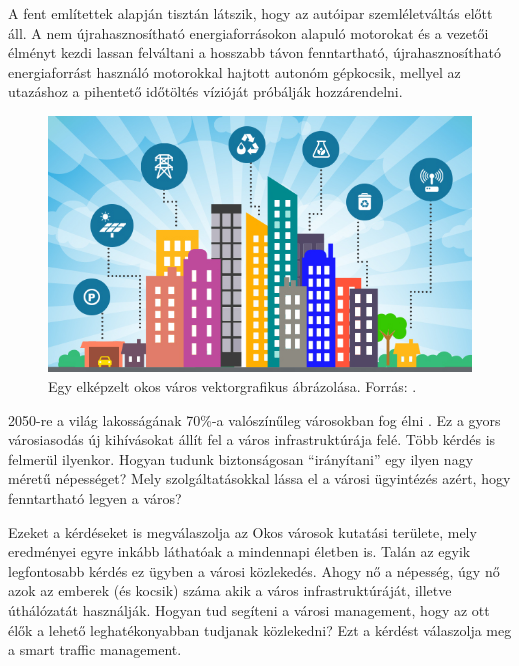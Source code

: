 \documentclass[a4paper,12pt]{report}
\begin{document}
\vspace{2mm}
A fent említettek alapján tisztán látszik, hogy az autóipar szemléletváltás előtt áll. A nem újrahasznosítható energiaforrásokon alapuló motorokat és a vezetői élményt kezdi lassan felváltani a hosszabb távon fenntartható, újrahasznosítható energiaforrást használó motorokkal hajtott autonóm gépkocsik, mellyel az utazáshoz a pihentető időtöltés vízióját próbálják hozzárendelni.

\begin{figure}[ht]
\centerline{
\includegraphics[width=6in]{img/smartcitylogo}}
\caption{Egy elképzelt okos város vektorgrafikus ábrázolása. Forrás: \cite{smartcitylogo}.}
\label{smartcitylogo}
\end{figure}

\vspace{2mm}
2050-re a világ lakosságának 70\%-a valószínűleg városokban fog élni \cite{unpopulation}. Ez a gyors városiasodás új kihívásokat állít fel a város infrastruktúrája felé. Több kérdés is felmerül ilyenkor. Hogyan tudunk biztonságosan ``irányítani'' egy ilyen nagy méretű népességet? Mely szolgáltatásokkal lássa el a városi ügyintézés azért, hogy fenntartható legyen a város? 

\vspace{2mm}
Ezeket a kérdéseket is megválaszolja az Okos városok kutatási területe, mely eredményei egyre inkább láthatóak a mindennapi életben is. Talán az egyik legfontosabb kérdés ez ügyben a városi közlekedés. Ahogy nő a népesség, úgy nő azok az emberek (és kocsik) száma akik a város infrastruktúráját, illetve úthálózatát használják. Hogyan tud segíteni a városi management, hogy az ott élők a lehető leghatékonyabban tudjanak közlekedni? Ezt a kérdést válaszolja meg a smart traffic management.
\end{document}
